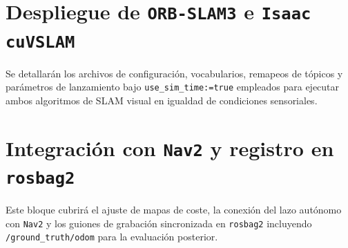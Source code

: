 
\section{Despliegue de \texttt{ORB-SLAM3} e \texttt{Isaac cuVSLAM}}
\label{sec:despliegue_slam}

Se detallarán los archivos de configuración, vocabularios, remapeos de tópicos y parámetros de lanzamiento bajo \texttt{use\_sim\_time:=true} empleados para ejecutar ambos algoritmos de SLAM visual en igualdad de condiciones sensoriales.


\section{Integración con \texttt{Nav2} y registro en \texttt{rosbag2}}
\label{sec:nav2_rosbag2}

Este bloque cubrirá el ajuste de mapas de coste, la conexión del lazo autónomo con \texttt{Nav2} y los guiones de grabación sincronizada en \texttt{rosbag2} incluyendo \texttt{/ground\_truth/odom} para la evaluación posterior.

